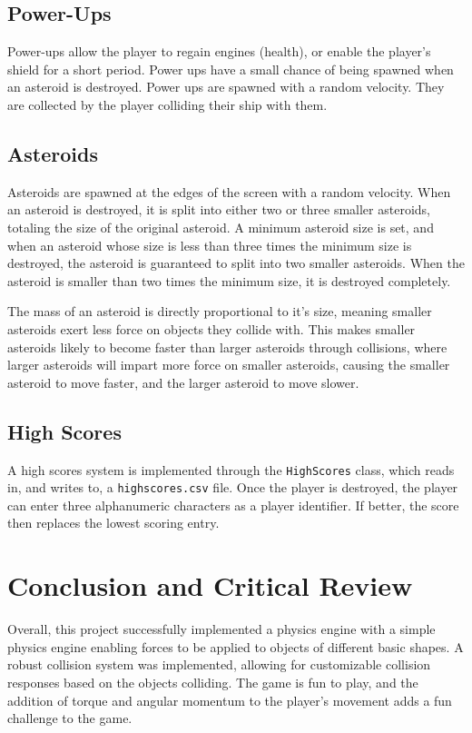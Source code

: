 \documentclass[12pt, a4paper]{article}
\begin{document}
\subsection{Power-Ups}

Power-ups allow the player to regain engines (health), or enable the player's shield for a short period. Power ups have a small chance of being spawned when an asteroid is destroyed. Power ups are spawned with a random velocity. They are collected by the player colliding their ship with them.

\subsection{Asteroids}

Asteroids are spawned at the edges of the screen with a random velocity. When an asteroid is destroyed, it is split into either two or three smaller asteroids, totaling the size of the original asteroid. A minimum asteroid size is set, and when an asteroid whose size is less than three times the minimum size is destroyed, the asteroid is guaranteed to split into two smaller asteroids. When the asteroid is smaller than two times the minimum size, it is destroyed completely.

The mass of an asteroid is directly proportional to it's size, meaning smaller asteroids exert less force on objects they collide with. This makes smaller asteroids likely to become faster than larger asteroids through collisions, where larger asteroids will impart more force on smaller asteroids, causing the smaller asteroid to move faster, and the larger asteroid to move slower.

\subsection{High Scores}

A high scores system is implemented through the \texttt{HighScores} class, which reads in, and writes to, a \texttt{highscores.csv} file. Once the player is destroyed, the player can enter three alphanumeric characters as a player identifier. If better, the score then replaces the lowest scoring entry.

\section{Conclusion and Critical Review}

Overall, this project successfully implemented a physics engine with a simple physics engine enabling forces to be applied to objects of different basic shapes. A robust collision system was implemented, allowing for customizable collision responses based on the objects colliding. The game is fun to play, and the addition of torque and angular momentum to the player's movement adds a fun challenge to the game.
\end{document}
